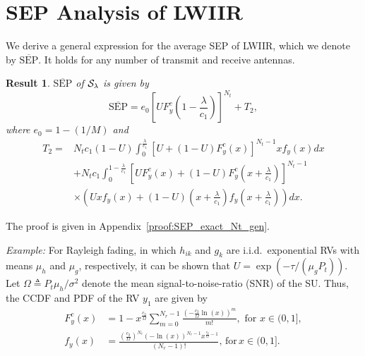 \documentclass[journal]{IEEEtran}
\newtheorem{result}{{\bf Result}}
\newcommand{\define}{\triangleq}
\newcommand{\SEP}{\text{SEP}}
\newcommand{\lam}{\lambda}
\newcommand{\mug}{{\mu_{g}}}
\newcommand{\muh}{{\mu_{h}}}
\newcommand{\termtwo}{T_2}
\newcommand{\Nt}{{N_t}}
\newcommand{\Nr}{{N_r}}
\newcommand{\Pt}{{P_t}}
\newcommand{\such}{h}
\newcommand{\puch}{g}
\newcommand{\hk}[1]{{\such_{#1}}}
\newcommand{\gk}[1]{{\puch_{#1}}}
\newcommand{\noisevar}{\sigma^2}
\newcommand{\itau}{\tau}
\newcommand{\cone}{c_{1}}
\newcommand{\ctwo}{c_{2}}
\newcommand{\lambycone}{\frac{\lam}{\cone}}
\newcommand{\yk}[1]{y_{#1}}
\newcommand{\inlccdfg}[1][]{\exp\left({-{{#1}\itau}/{\left( \mug\Pt\right) }}\right)}
\newcommand{\al}{\ctwo}
\newcommand{\snr}{\Omega}
\newcommand{\albysnr}[1][]{\frac{\al#1}{\snr}}
\newcommand{\un}{U}
\newcommand{\zerosep}{e_0}
\newcommand{\callamrule}{{\cal S_{{\lam}}}}
\newcommand{\avgSEP}{\overline{\SEP}}
\newcommand{\pdfyNr}{\frac{\left(\albysnr\right)^{\Nr}\left(-\ln\left({x}\right)\right)^{\Nr-1}x^{\albysnr[]-1}}{(\Nr-1)!}} %
\newcommand{\pdfyNrgen}[1]{f_{y}\left(#1\right)} %
\newcommand{\ccdfy}[1]{F^{c}_{y}\left(#1 \right)}
\newcommand{\unccdfygen}[2]{{#1} \ccdfy{#2}  }
\newcommand{\ccdfyrv}[1]{ F^{c}_{y}\left(#1 \right) }
\begin{document}
\section{SEP Analysis of LWIIR}
\label{sec:SEPanalysis}
We derive a general expression for the average SEP of LWIIR, which we denote by  $\avgSEP$. It holds for any number of transmit and receive antennas. 

\begin{result}
\label{thm:SEP_exact_Nt_gen}
$\avgSEP$ of $\callamrule$ is given by
\begin{equation}
\label{eq:SEP_Nt_gen} 
\avgSEP= \zerosep\left[\unccdfygen{\un}{1-\lambycone}\right]^{\Nt} + \termtwo,
\end{equation}
%
where $\zerosep = 1 - \left( {1}/{M}\right) $ and
\begin{align}
\termtwo = &\Nt\cone(1-\un)\int_{0}^{\lambycone} \left[\un + \unccdfygen{(1-\un)}{x}\right]^{\Nt-1} x\pdfyNrgen{x} dx\nonumber\\
&+ \Nt\cone \int_{0}^{1-\lambycone}\!\!
\left[\unccdfygen{\un}{x} +\unccdfygen{(1-\un)}{x+\lambycone}  \right]^{\Nt-1}\nonumber\\
&\times\left(\un x\pdfyNrgen{x} + (1-\un)\left(x + \lambycone\right) \pdfyNrgen{x + \lambycone}\right) dx.
\label{eq:termtwo_gen}
\end{align}
%
\end{result}
%
\begin{IEEEproof}
The proof is given in Appendix~\ref{proof:SEP_exact_Nt_gen}.
\end{IEEEproof}
%


{\em Example:} For Rayleigh fading, in which $\hk{ik}$ and $\gk{k}$ are i.i.d.\ exponential RVs with means $\muh$ and $\mug$, respectively, it can be shown that $\un=\inlccdfg[]$. Let $\snr\define\Pt\muh/\noisevar$ denote the mean signal-to-noise-ratio (SNR) of the SU. Thus, the CCDF and PDF of the RV $\yk{1}$ are given by 
\begin{align}
\label{eq:ccdfyNr}
\ccdfyrv{x} &= 1 - x^{\albysnr} \sum_{m=0}^{\Nr-1} \frac{\left(-\albysnr \ln(x) \right)^{m}}{m!}, \,\, \text{for}\,\, x \in (0,1],\\
\label{eq:pdfyNr}
\pdfyNrgen{x} &= \pdfyNr, \, \text{for}\,  x \in (0,1].
\end{align}
\newcommand{\tl}{t_l}
\end{document}
